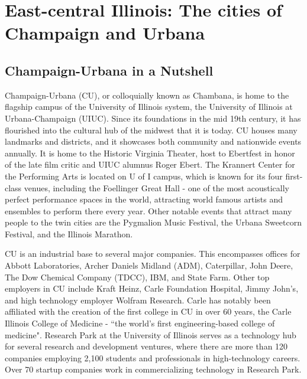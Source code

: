 \section{East-central Illinois: The cities of Champaign and Urbana}

\subsection{Champaign-Urbana in a Nutshell}

Champaign-Urbana (CU), or colloquially known as Chambana, is home to the flagship campus of the University of Illinois system, the University of Illinois at Urbana-Champaign (UIUC). Since its foundations in the mid 19th century, it has flourished into the cultural hub of the midwest that it is today. CU houses many landmarks and districts, and it showcases both community and nationwide events annually. It is home to the Historic Virginia Theater, host to Ebertfest in honor of the late film critic and UIUC alumnus Roger Ebert. The Krannert Center for the Performing Arts is located on U of I campus, which is known for its four first-class venues, including the Foellinger Great Hall - one of the most acoustically perfect performance spaces in the world, attracting world famous artists and ensembles to perform there every year. Other notable events that attract many people to the twin cities are the Pygmalion Music Festival, the Urbana Sweetcorn Festival, and the Illinois Marathon. 

CU is an industrial base to several major companies. This encompasses offices for Abbott Laboratories, Archer Daniels Midland (ADM), Caterpillar, John Deere, The Dow Chemical Company (TDCC), IBM, and State Farm. Other top employers in CU include Kraft Heinz, Carle Foundation Hospital, Jimmy John's, and high technology employer Wolfram Research. Carle has notably been affiliated with the creation of the first college in CU in over 60 years, the Carle Illinois College of Medicine -  ``the world's first engineering-based college of medicine". Research Park at the University of Illinois serves as a technology hub for several research and development ventures, where there are more than 120 companies employing 2,100 students and professionals in high-technology careers. Over 70 startup companies work in commercializing technology in Research Park. 



